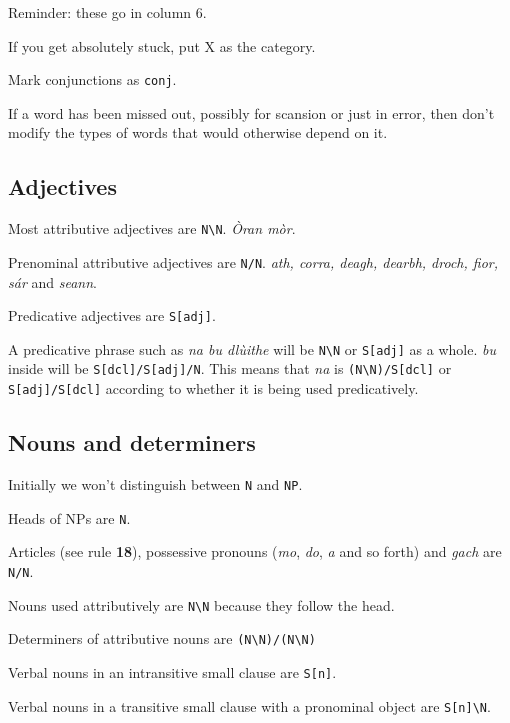 \documentclass[a4paper]{article}
\begin{document}
Reminder: these go in column 6.

 If you get absolutely stuck, put X as the category.

 Mark conjunctions as \texttt{conj}.

 If a word has been missed out, possibly for scansion or just in error, then don't modify the types of words that would otherwise depend on it.

\subsection{Adjectives}

 Most attributive adjectives are \texttt{N\textbackslash N}. \textit{\`Oran m\`or}.

 Prenominal attributive adjectives are \texttt{N/N}. \textit{ath, corra, deagh, dearbh, droch, fior, s\'ar} and \textit{seann}.

 Predicative adjectives are \texttt{S[adj]}.

 A predicative phrase such as \textit{na bu dl\`uithe} will be \texttt{N\textbackslash N} or \texttt{S[adj]} as a whole. \textit{bu} inside will be \texttt{S[dcl]/S[adj]/N}. This means that \textit{na} is \texttt{(N\textbackslash N)/S[dcl]} or \texttt{S[adj]/S[dcl]} according to whether it is being used predicatively.

\subsection{Nouns and determiners}

Initially we won't distinguish between \texttt{N} and \texttt{NP}.

 Heads of NPs are \texttt{N}.

 Articles (see rule {\bf 18}), possessive pronouns (\textit{mo}, \textit{do}, \textit{a} and so forth) and \textit{gach} are \texttt{N/N}.

 Nouns used attributively are \texttt{N\textbackslash N} because they follow the head.

 Determiners of attributive nouns are \texttt{(N\textbackslash N)/(N\textbackslash N)}

 Verbal nouns in an intransitive small clause are \texttt{S[n]}.

 Verbal nouns in a transitive small clause with a pronominal object are \texttt{S[n]\textbackslash N}.
\end{document}
